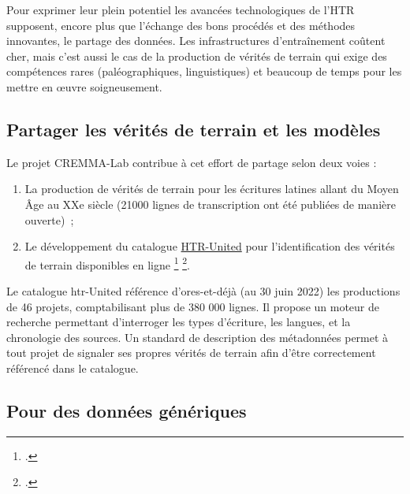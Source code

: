 \documentclass[a4paper,12pt,twoside]{book}
\begin{document}
		Pour exprimer leur plein potentiel les avancées technologiques de l'HTR
		supposent, encore plus que l'échange des bons procédés et des méthodes
		innovantes, le partage des données. Les infrastructures d'entraînement
		coûtent cher, mais c'est aussi le cas de la production de vérités de
		terrain qui exige des compétences rares (paléographiques, linguistiques)
		et beaucoup de temps pour les mettre en œuvre soigneusement.
		
		\subsection{Partager les vérités de terrain et les modèles}
		
		Le projet CREMMA-Lab contribue à cet effort de partage selon deux voies
		:
		
		\begin{enumerate}
			
			\item
			La production de vérités de terrain pour les écritures latines allant
			du Moyen Âge au XXe siècle (21000 lignes de transcription ont été
			publiées de manière ouverte)~;
			\item
			Le développement du catalogue
			\href{https://htr-united.github.io/catalog.html}{HTR-United} pour
			l'identification des vérités de terrain disponibles en ligne
			\footcite{campsCremmaLabProjectsTranscription2022}
			\footcite{chagueSharingHTRDatasets2022}.
		\end{enumerate}
		
		Le catalogue \gls{htr}-United référence d'ores-et-déjà (au 30 juin 2022) les
		productions de 46 projets, comptabilisant plus de 380 000 lignes. Il
		propose un moteur de recherche permettant d'interroger les types
		d'écriture, les langues, et la chronologie des sources. Un standard de
		description des métadonnées permet à tout projet de signaler ses propres
		vérités de terrain afin d'être correctement référencé dans le catalogue.
		
		\subsection{Pour des données génériques}
		
\end{document}
